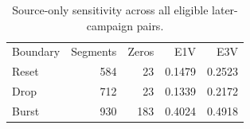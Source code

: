 \begin{table}[!ht]
\centering\small
\caption{Source-only sensitivity across all eligible later-campaign pairs.}
\begin{tabular}{lrrrr}
\hline
Boundary & Segments & Zeros & E1V & E3V \\
Reset & 584 & 23 & 0.1479 & 0.2523 \\
Drop & 712 & 23 & 0.1339 & 0.2172 \\
Burst & 930 & 183 & 0.4024 & 0.4918 \\
\hline
\end{tabular}
\end{table}
